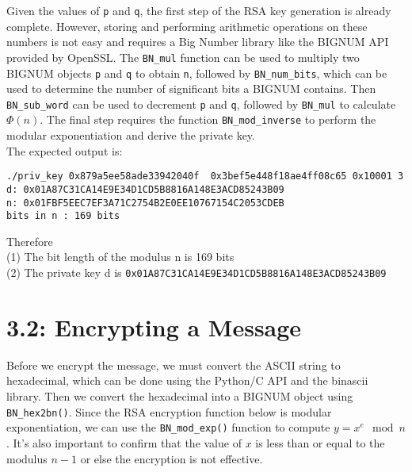 \documentclass[a4paper,11pt]{article}
\theoremstyle{mytheor}
\begin{document}
\vspace{2mm} %
\noindent Given the values of \texttt{p} and \texttt{q}, the first step of the RSA key generation is already complete. However, storing and performing arithmetic operations on these numbers is not easy and requires a Big Number library like the BIGNUM API provided by OpenSSL. The \texttt{BN\_mul} function can be used to multiply two BIGNUM objects \texttt{p} and \texttt{q} to obtain \texttt{n}, followed by \texttt{BN\_num\_bits}, which can be used to determine the number of significant bits a BIGNUM contains. Then \texttt{BN\_sub\_word} can be used to decrement \texttt{p} and \texttt{q}, followed by \texttt{BN\_mul} to calculate \(\Phi(n)\). The final step requires the function \texttt{BN\_mod\_inverse} to perform the modular exponentiation and derive the private key.\\



\vspace{4mm}
\noindent The expected output is:

\begin{verbatim}
./priv_key 0x879a5ee58ade33942040f  0x3bef5e448f18ae4ff08c65 0x10001 3
d: 0x01A87C31CA14E9E34D1CD5B8816A148E3ACD85243B09
n: 0x01FBF5EEC7EF3A71C2754B2E0EE10767154C2053CDEB
bits in n : 169 bits
\end{verbatim}

\noindent Therefore \\
(1) The bit length of the modulus n is 169 bits \\
(2) The private key d is \texttt{0x01A87C31CA14E9E34D1CD5B8816A148E3ACD85243B09}

\vspace{-2mm}
\section*{\large 3.2: Encrypting a Message}

\noindent Before we encrypt the message, we must convert the ASCII string to hexadecimal, which can be done using the Python/C API and the binascii library. Then we convert the hexadecimal into a BIGNUM object using \texttt{BN\_hex2bn()}. Since the RSA encryption function below is modular exponentiation, we can use the \texttt{BN\_mod\_exp()} function to compute \(y = x^e \mod n\). It's also important to confirm that the value of \(x\) is less than or equal to the modulus \(n -1\) or else the encryption is not effective. \\
\end{document}
